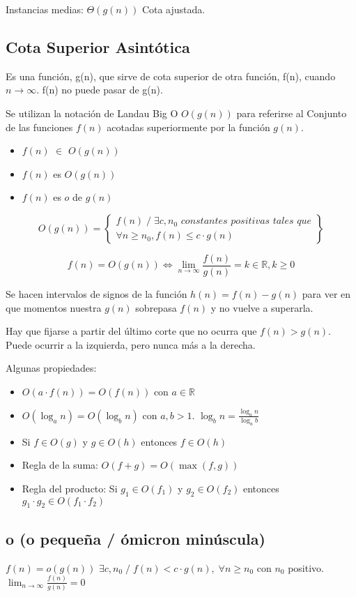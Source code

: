 Instancias medias: $\Theta\left(g\left(n\right)\right)$ Cota ajustada.

\subsection{Cota Superior Asintótica}
Es una función, g(n), que sirve de cota superior de otra función, f(n), cuando $n\rightarrow \infty$. f(n) no puede pasar de g(n).

Se utilizan la notación de Landau Big O $O(g(n))$ para referirse al Conjunto de las funciones $f(n)$ acotadas superiormente por la función $g(n)$.
\begin{itemize}
	\item $f(n)$ $\in$ $O(g(n))$
	\item $f(n)$ es $O(g(n))$
	\item $f(n)$ es $o$ de $g(n)$
\end{itemize}

$$O(g(n))=\left\{\begin{matrix}
		f(n)\;/\;\exists c, n_0 \textit{ constantes positivas tales que} \\
		\forall n \geq n_0, f(n) \leq c \cdot g(n)
	\end{matrix}\right\}$$

$$f(n)=O(g(n)) \Leftrightarrow \lim_{n \rightarrow \infty} \frac{f(n)}{g(n)}= k \in \mathbb{R}, k \geq 0$$

Se hacen intervalos de signos de la función $h(n) = f(n)-g(n)$ para ver en que momentos nuestra $g(n)$ sobrepasa $f(n)$ y no vuelve a superarla.

Hay que fijarse a partir del último corte que no ocurra que $f(n) > g(n)$. Puede ocurrir a la izquierda, pero nunca más a la derecha.

Algunas propiedades:
\begin{itemize}
	\item $O(a \cdot f(n))= O(f(n))$ con $a \in \mathbb{R}$
	\item $O(\log_a n) = O(\log_b n)$ con $a,b > 1$. $\log_b n = \frac{\log_a n}{\log_a b}$
	\item Si $f \in O(g)$ y $g \in O(h)$ entonces $f \in O(h)$
	\item Regla de la suma: $O(f+g)=O(\max(f, g))$
	\item Regla del producto: Si $g_1 \in O(f_1)$ y $g_2 \in O(f_2)$ entonces $g_1 \cdot g_2 \in O(f_1 \cdot f_2)$
\end{itemize}

\subsection{o (o pequeña / ómicron minúscula)}
$f(n)=o(g(n))$ $\exists c, n_0\;/\; f(n)<c\cdot g(n), \; \forall n \geq n_0$ con $n_0$ positivo. $\lim_{n \rightarrow \infty} \frac{f(n)}{g(n)}=0$


